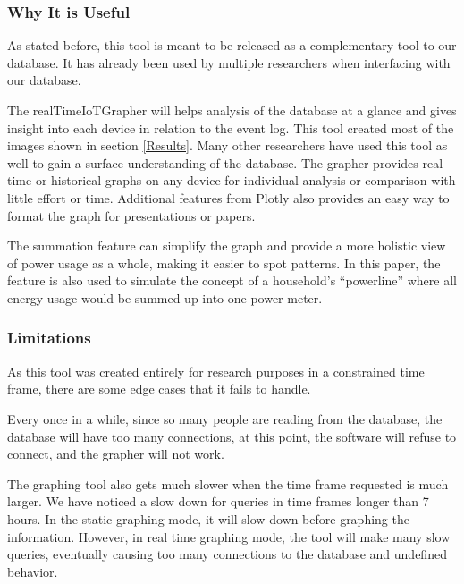 \subsubsection{Why It is Useful}
As stated before, this tool is meant to be released as a complementary tool to our database. It has already been used by multiple researchers when interfacing with our database.

The realTimeIoTGrapher will helps analysis of the database at a glance and gives insight into each device in relation to the event log.  This tool created most of the images shown in section \ref{Results}. Many other researchers have used this tool as well to gain a surface understanding of the database. The grapher provides real-time or historical graphs on any device for individual analysis or comparison with little effort or time. Additional features from Plotly also provides an easy way to format the graph for presentations or papers.

The summation feature can simplify the graph and provide a more holistic view of power usage as a whole, making it easier to spot patterns. In this paper, the feature is also used to simulate the concept of a household's ``powerline'' where all energy usage would be summed up into one power meter.

\subsubsection{Limitations}
As this tool was created entirely for research purposes in a constrained time frame, there are some edge cases that it fails to handle.

Every once in a while, since so many people are reading from the database, the database will have too many connections, at this point, the software will refuse to connect, and the grapher will not work.

The graphing tool also gets much slower when the time frame requested is much larger. We have noticed a slow down for queries in time frames longer than 7 hours. In the static graphing mode, it will slow down before graphing the information. However, in real time graphing mode, the tool will make many slow queries, eventually causing too many connections to the database and undefined behavior.


